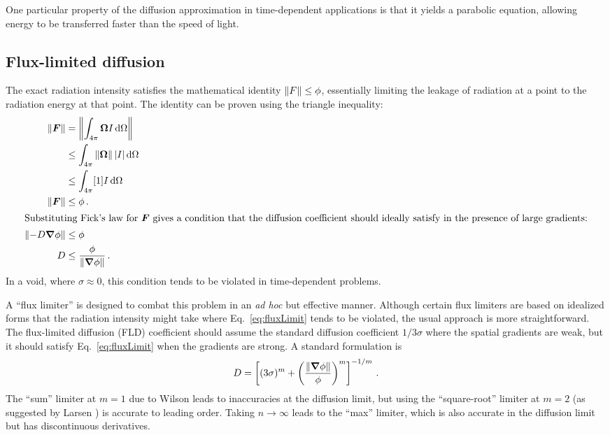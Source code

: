 One particular property of the diffusion approximation in time-dependent
applications is that it yields a parabolic equation, allowing energy to be
transferred faster than the speed of light.

\subsection{Flux-limited diffusion}\label{sec:bgFld}

The exact radiation intensity satisfies the mathematical identity $\left\| F \right\| \le
\phi$,
essentially limiting the leakage of radiation at a point to the radiation
energy at that point. The identity can be proven using the triangle inequality:
\begin{align}
  \left\| \bm{F} \right\| &= \left\|  \int_{4\pi} \bm{\Omega} I \mathop{}\!\mathrm{d} \Omega \right\|
  \\ \nonumber
  &\le \int_{4\pi} \left\| \bm{\Omega} \right\| \left| I \right| \mathop{}\!\mathrm{d} \Omega 
  \\ \nonumber
  &\le \int_{4\pi} [1] I \mathop{}\!\mathrm{d}\Omega
  \\ \nonumber
  \left\| \bm{F} \right\| &\le \phi\,.
  \\ 
  \intertext{Substituting Fick's law for $\bm{F}$ gives a condition that the
  diffusion coefficient should ideally satisfy in the presence of large
  gradients:} \nonumber
  \left\| - D \bm{\nabla} \phi \right\| &\le \phi
  \\ \label{eq:fluxLimit}
  D & \le \frac{\phi}{\left\| \bm{\nabla} \phi \right\|} \,.
\end{align}
In a void, where $\sigma\approx 0$, this condition tends to be violated in
time-dependent problems.

A ``flux limiter'' is designed to combat this problem in an \emph{ad hoc} but
effective manner. Although certain flux limiters \cite{Lev1984} are based on
idealized forms that the radiation intensity might take where
Eq.~\eqref{eq:fluxLimit} tends to be violated, the usual approach is more
straightforward. The flux-limited diffusion (FLD) coefficient should assume the
standard diffusion coefficient $1/3\sigma$ where the spatial gradients are weak,
but it should satisfy Eq.~\eqref{eq:fluxLimit} when the gradients are strong.
A standard formulation \cite{Ols2000} is
\begin{equation} \label{eq:fluxLimiter}
  D = \left[ (3\sigma)^{m} + \left( \frac{\left\| \bm{\nabla}
  \phi \right\|}{\phi} \right)^{m}\right]^{-1/m} \,.
\end{equation}
The ``sum'' limiter at $m=1$ due to Wilson \cite{Mor2000} leads to inaccuracies
at the diffusion limit, but using the ``square-root'' limiter at $m=2$ (as
suggested by Larsen \cite{Ols2000}) is accurate to leading order. Taking
$n\to\infty$ leads to the ``max'' limiter, which is also accurate in the
diffusion limit but has discontinuous derivatives.

